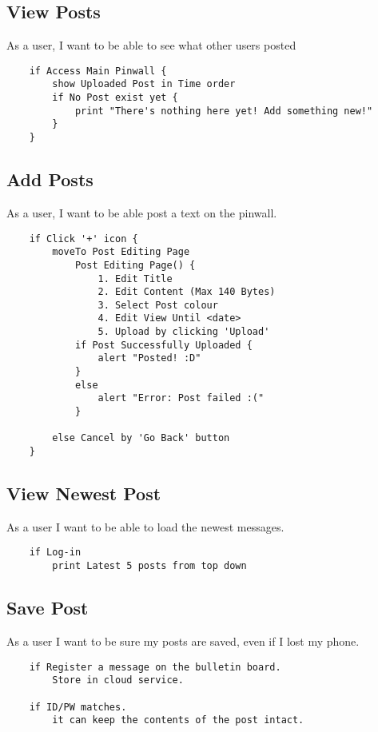 \documentclass[conference]{IEEEtran}
\numberwithin{figure}{subsection}
\begin{document}
\subsection{View Posts}
As a user, I want to be able to see what other users posted
\begin{lstlisting}
    if Access Main Pinwall {
        show Uploaded Post in Time order
        if No Post exist yet {
            print "There's nothing here yet! Add something new!"
        }
    }
\end{lstlisting}
	
\subsection{Add Posts}
As a user, I want to be able post a text on the pinwall.
\begin{lstlisting}
    if Click '+' icon {
        moveTo Post Editing Page
            Post Editing Page() {
                1. Edit Title
                2. Edit Content (Max 140 Bytes)
                3. Select Post colour
                4. Edit View Until <date>
                5. Upload by clicking 'Upload'
            if Post Successfully Uploaded {
                alert "Posted! :D"
            }
            else
                alert "Error: Post failed :("
            }
        
        else Cancel by 'Go Back' button
    }
\end{lstlisting}

\subsection{View Newest Post}
As a user I want to be able to load the newest messages.
\begin{lstlisting}
    if Log-in
        print Latest 5 posts from top down
\end{lstlisting}

\subsection{Save Post}
As a user I want to be sure my posts are saved, even if I lost my phone.\\
\begin{lstlisting}
    if Register a message on the bulletin board.
        Store in cloud service.
        
    if ID/PW matches.
        it can keep the contents of the post intact.
\end{lstlisting}
\end{document}

